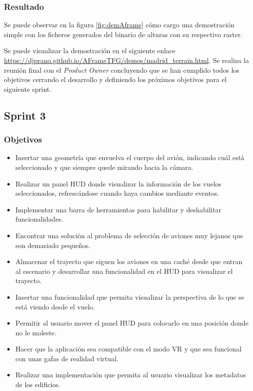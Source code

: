 \documentclass[a4paper, 11pt]{book}
\begin{document}
\subsubsection{Resultado}
Se puede observar en la figura \ref{fig:demAframe} cómo cargo una demostración simple con los ficheros generados del binario de alturas con su respectivo \gls{raster}. 

Se puede visualizar la demostración en el siguiente enlace \url{https://djprano.github.io/AFrameTFG/demos/madrid_terrain.html}.
Se realiza la reunión final con el \emph{Product Owner} concluyendo que se han cumplido todos los objetivos cerrando el desarrollo y definiendo los próximos objetivos para el siguiente sprint.
\subsection{Sprint 3}
\subsubsection{Objetivos}
\begin{itemize}
    \item Insertar una geometría que envuelva el cuerpo del avión, indicando cuál está seleccionado y que siempre quede mirando hacia la cámara.
    \item Realizar un panel \textsc{\gls{HUD}} donde visualizar la información de los vuelos seleccionados, refrescándose cuando haya cambios mediante eventos.
    \item Implementar una barra de herramientas para habilitar y deshabilitar funcionalidades.
    \item Encontrar una solución al problema de selección de aviones muy lejanos que son demasiado pequeños.
    \item Almacenar el trayecto que siguen los aviones en una caché desde que entran al escenario y desarrollar una funcionalidad en el \textsc{\gls{HUD}} para visualizar el trayecto.
    \item Insertar una funcionalidad que permita visualizar la perspectiva de lo que se está viendo desde el vuelo.
    \item Permitir al usuario mover el panel \textsc{\gls{HUD}} para colocarlo en una posición donde no le moleste.
    \item Hacer que la aplicación sea compatible con el modo VR y que sea funcional con unas gafas de realidad virtual.
    \item Realizar una implementación que permita al usuario visualizar los metadatos de los edificios.
\end{itemize}
\end{document}
